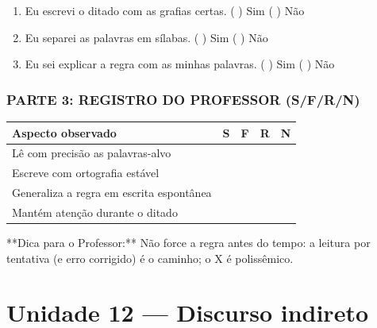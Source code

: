 \begin{exercicio}
\begin{enumerate}[label=\alph*)]
  \item Eu escrevi o ditado com as grafias certas.  \quad ( ) Sim   ( ) Não

  \item Eu separei as palavras em sílabas.  \quad ( ) Sim   ( ) Não

  \item Eu sei explicar a regra com as minhas palavras.  \quad ( ) Sim   ( ) Não

\end{enumerate}

\subsection*{PARTE 3: REGISTRO DO PROFESSOR (S/F/R/N)}

\begin{center}
\renewcommand{\arraystretch}{1.4}
\begin{tabular}{@{}p{9cm}cccc@{}}
\toprule
Aspecto observado & S & F & R & N \\
\midrule
Lê com precisão as palavras-alvo & & & & \\
Escreve com ortografia estável & & & & \\
Generaliza a regra em escrita espontânea & & & & \\
Mantém atenção durante o ditado & & & & \\
\bottomrule\end{tabular}\end{center}

\end{exercicio}

\begin{dica}
**Dica para o Professor:** Não force a regra antes do tempo: a leitura por tentativa (e erro corrigido) é o caminho; o X é polissêmico.
\end{dica}


\chapter{Unidade 12 --- Discurso indireto}


